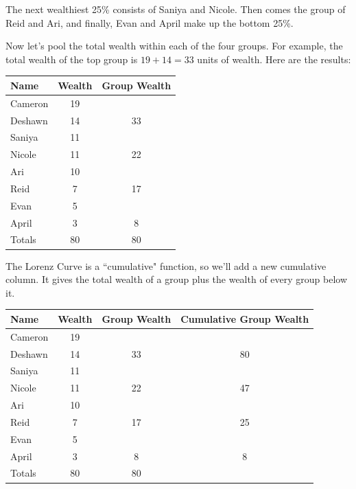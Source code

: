 \documentclass[12pt]{memoir}\usepackage[]{graphicx}\usepackage[table]{xcolor}
\begin{document}
The next wealthiest 25\% consists of Saniya and Nicole.  Then comes the group of 
Reid and Ari, and finally, Evan and April make up the bottom 25\%.  

Now let's pool the total wealth within each of the four groups.  For example,
the total wealth of the top group is $19 + 14 = 33$ units of wealth.  Here
are the results: 

\begin{center}
\begin{tabular}{lcc}
\toprule
Name & Wealth & Group Wealth \\ \midrule
\rowcolor{gray!50}
Cameron & 19 & \\ \midrule
\rowcolor{gray!50}
Deshawn & 14 & 33 \\ \midrule
Saniya  & 11 &    \\ \midrule
Nicole  & 11 & 22 \\ \midrule
\rowcolor{gray!50}
Ari     & 10 &    \\ \midrule
\rowcolor{gray!50}
Reid    & 7 & 17  \\ \midrule
Evan    & 5  &    \\ \midrule
April   & 3  & 8  \\ \midrule
Totals  & 80  & 80 \\ \bottomrule
\end{tabular}
\end{center}

The Lorenz Curve is a ``cumulative" function, so we'll add a new cumulative 
column.  It gives the total wealth of a group plus the wealth of every group 
below it.

\begin{center}
\begin{tabular}{lccc}
\toprule
Name & Wealth & Group Wealth & Cumulative Group Wealth \\ \midrule
\rowcolor{gray!50}
Cameron & 19 &  & \\ \midrule
\rowcolor{gray!50}
Deshawn & 14 & 33 & 80 \\ \midrule
Saniya  & 11 &    \\ \midrule
Nicole  & 11 & 22 & 47 \\ \midrule
\rowcolor{gray!50}
Ari     & 10 &  &  \\ \midrule
\rowcolor{gray!50}
Reid    & 7 & 17 & 25 \\ \midrule
Evan    & 5  &  &  \\ \midrule
April   & 3  & 8 & 8  \\ \midrule
Totals  & 80  & 80  &\\ \bottomrule
\end{tabular}
\end{center}
\end{document}
